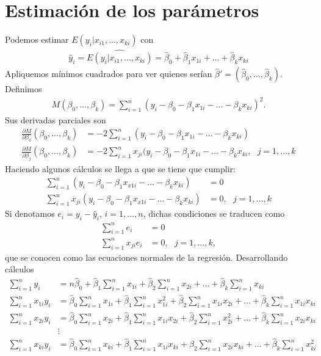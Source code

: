 \section{Estimación de los parámetros}
\noindent Podemos estimar $E(y_i | x_{i1},\ldots,x_{ki})$ con
\begin{align*}
    \widehat{y}_i = \widehat{E(y_i | x_{i1},\ldots,x_{ki})} = \widehat{\beta}_0 + \widehat{\beta}_1 x_{1i} + \ldots + \widehat{\beta}_k x_{ki}
\end{align*}
Apliquemos mínimos cuadrados para ver quienes serían $\widehat{\beta}' = (\widehat{\beta}_0,\ldots,\widehat{\beta}_k)$. Definimos
\begin{align*}
    M(\beta_0,\ldots,\beta_k) = \sum_{i=1}^{n} (y_i - \beta_0 - \beta_1 x_{1i} - \ldots - \beta_k x_{ki})^2.
\end{align*}
Sus derivadas parciales son
\begin{align*}
    \frac{\partial M}{\partial \beta_0} (\beta_0,\ldots,\beta_k) &= -2 \sum_{i=1}^{n} (y_i - \beta_0 - \beta_1 x_{1i} - \ldots - \beta_k x_{ki}) \\
    \frac{\partial M}{\partial \beta_j} (\beta_0,\ldots,\beta_k) &= -2\sum_{i=1}^{n} x_{ji} (y_i - \beta_0 - \beta_1 x_{1i} - \ldots - \beta_k x_{ki}, \ \ \ j = 1,\ldots,k
\end{align*}
Haciendo algunos cálculos se llega a que se tiene que cumplir:
\begin{align*}
    \sum_{i=1}^{n} (y_i - \beta_0 - \beta_1 x_{x1i} - \ldots - \beta_k x_{ki}) & = 0 \\
    \sum_{i=1}^{n} x_{ji} (y_i - \beta_0 - \beta_1 x_{x1i} - \ldots - \beta_k x_{ki}) &= 0, \ \ \ j = 1,\ldots,k
\end{align*}
Si denotamos $e_i = y_i - \widehat{y}_i$, $i = 1,\ldots,n$, dichas condiciones se traducen como
\begin{align*}
    \sum_{i=1}^{n} e_i &= 0 \\
    \sum_{i=1}^{n} x_{ji} e_i &=0, \ \ \ j = 1,\ldots,k,
\end{align*}
que se conocen como las ecuaciones normales de la regresión. Desarrollando cálculos
\begin{align*}
    \sum_{i=1}^{n} y_i &= n \widehat{\beta}_0 + \widehat{\beta}_1 \sum_{i=1}^{n} x_{1i} + \widehat{\beta}_2 \sum_{i=1}^{n} x_{2i} + \ldots + \widehat{\beta}_k \sum_{i=1}^{n} x_{ki} \\
    \sum_{i=1}^{n} x_{1i} y_i &= \widehat{\beta}_0 \sum_{i=1}^{n} x_{1i} + \widehat{\beta}_1 \sum_{i=1}^{n} x_{1i}^2 + \widehat{\beta}_2 \sum_{i=1}^{n} x_{1i} x_{2i} + \ldots + \widehat{\beta}_k \sum_{i=1}^{n} x_{1i} x_{ki} \\
    \sum_{i=1}^{n} x_{2i} y_i &= \widehat{\beta}_0 \sum_{i=1}^{n} x_{2i} + \widehat{\beta}_1 \sum_{i=1}^{n} x_{1i} x_{2i} + \widehat{\beta}_2 \sum_{i=1}^{n} x_{2i}^2 + \ldots + \widehat{\beta}_k \sum_{i=1}^{n} x_{2i} x_{ki} \\
    & \vdots \\
    \sum_{i=1}^{n} x_{ki} y_i &= \widehat{\beta}_0 \sum_{i=1}^{n} x_{ki} + \widehat{\beta}_1 \sum_{i=1}^{n} x_{1i} x_{ki} + \widehat{\beta}_2 \sum_{i=1}^{n} x_{2i} x_{ki} + \ldots + \widehat{\beta}_k \sum_{i=1}^{n} x_{ki}^2 
\end{align*}
